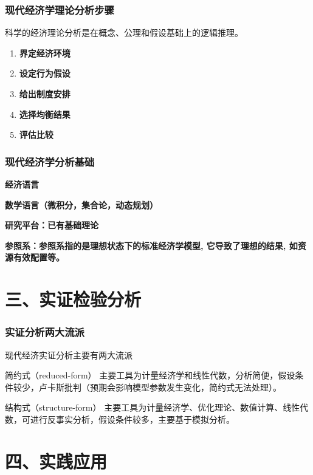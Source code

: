 \documentclass[aspectratio=169, 12pt]{beamer}
\begin{document}
\begin{frame}[plain]
    \frametitle{现代经济学理论分析步骤}
    科学的经济理论分析是在概念、公理和假设基础上的逻辑推理。
    \begin{enumerate}
        \item \textbf{界定经济环境}
        \item \textbf{设定行为假设}
        \item \textbf{给出制度安排}
        \item \textbf{选择均衡结果}
        \item \textbf{评估比较}
    \end{enumerate}
    \blindfootnote{ }
    \blindfootnote{ }
\end{frame}

\begin{frame}[plain]
    \frametitle{现代经济学分析基础}
    \textbf{经济语言}
    \par
    \textbf{数学语言（微积分，集合论，动态规划）}
    \par
    \textbf{研究平台：已有基础理论}
    \par
    \textbf{参照系：参照系指的是理想状态下的标准经济学模型, 它导致了理想的结果, 如资源有效配置等。}
\end{frame}

\section{三、实证检验分析}

\begin{frame}[plain]
    \frametitle{实证分析两大流派}
    现代经济实证分析主要有两大流派
    \begin{block}{简约式（reduced-form）}
        主要工具为计量经济学和线性代数，分析简便，假设条件较少，卢卡斯批判（预期会影响模型参数发生变化，简约式无法处理）。
    \end{block}
    \begin{block}{结构式（structure-form）}
        主要工具为计量经济学、优化理论、数值计算、线性代数，可进行反事实分析，假设条件较多，主要基于模拟分析。
    \end{block}
    \blindfootnote{ }
    \blindfootnote{ }
\end{frame}

\section{四、实践应用}
\end{document}
